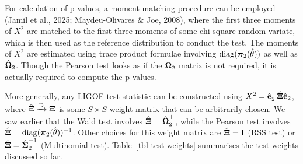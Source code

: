 \documentclass[
  letterpaper,
  DIV=11,
  numbers=noendperiod]{scrartcl}
\begin{document}
For calculation of p-values, a moment matching procedure can be employed
(Jamil et al., 2025; Maydeu-Olivares \& Joe, 2008), where the first
three moments of \(X^2\) are matched to the first three moments of some
chi-square random variate, which is then used as the reference
distribution to conduct the test. The moments of \(X^2\) are estimated
using trace product formulae involving \(\operatorname{diag}({\boldsymbol\pi}_2(\hat\theta))\) as
well as \(\hat{{\boldsymbol\Omega}}_2\). Though the Pearson test looks as if the
\({\boldsymbol\Omega}_2\) matrix is not required, it is actually required to compute
the p-values.

More generally, any LIGOF test statistic can be constructed using
\(X^2 = \hat{{\mathbf e}}_2^\top \hat{{\boldsymbol\Xi}} \hat{{\mathbf e}}_2\), where
\(\hat{{\boldsymbol\Xi}} \xrightarrow{\text D} {\boldsymbol\Xi}\) is some \(S\times S\) weight
matrix that can be arbitrarily chosen. We saw earlier that the Wald test
involves \(\hat{{\boldsymbol\Xi}}=\hat{{\boldsymbol\Omega}}_2^{+}\), while the Pearson test involves
\(\hat{{\boldsymbol\Xi}} = \operatorname{diag}({\boldsymbol\pi}_2(\hat\theta))^{-1}\). Other choices for this
weight matrix are \(\hat{{\boldsymbol\Xi}} = {\mathbf I}\) (RSS test) or
\(\hat{{\boldsymbol\Xi}} = \hat{{\boldsymbol\Sigma}}_2^{-1}\) (Multinomial test).
Table~\ref{tbl-test-weights} summarises the test weights discussed so
far.
\end{document}
